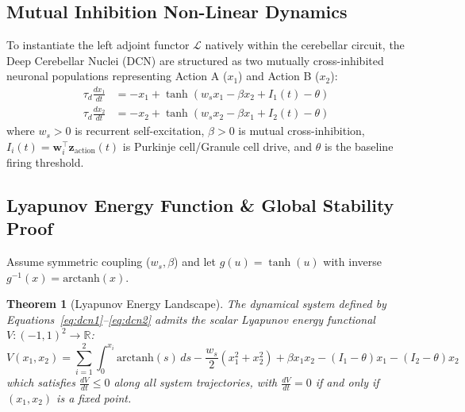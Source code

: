 \documentclass[11pt,a4paper]{article}
\newtheorem{theorem}{Theorem}
\begin{document}
\subsection{Mutual Inhibition Non-Linear Dynamics}
To instantiate the left adjoint functor $\mathcal{L}$ natively within the cerebellar circuit, the Deep Cerebellar Nuclei (DCN) are structured as two mutually cross-inhibited neuronal populations representing Action A ($x_1$) and Action B ($x_2$):
\begin{align}
\tau_d \frac{dx_1}{dt} &= -x_1 + \tanh\left( w_s x_1 - \beta x_2 + I_1(t) - \theta \right) \label{eq:dcn1} \\
\tau_d \frac{dx_2}{dt} &= -x_2 + \tanh\left( w_s x_2 - \beta x_1 + I_2(t) - \theta \right) \label{eq:dcn2}
\end{align}
where $w_s > 0$ is recurrent self-excitation, $\beta > 0$ is mutual cross-inhibition, $I_i(t) = \mathbf{w}_{i}^\top \mathbf{z}_{\text{action}}(t)$ is Purkinje cell/Granule cell drive, and $\theta$ is the baseline firing threshold.

\subsection{Lyapunov Energy Function \& Global Stability Proof}
Assume symmetric coupling ($w_s, \beta$) and let $g(u) = \tanh(u)$ with inverse $g^{-1}(x) = \text{arctanh}(x)$.

\begin{theorem}[Lyapunov Energy Landscape]
The dynamical system defined by Equations~\eqref{eq:dcn1}--\eqref{eq:dcn2} admits the scalar Lyapunov energy functional $V: (-1, 1)^2 \to \mathbb{R}$:
\begin{equation}
V(x_1, x_2) = \sum_{i=1}^2 \int_0^{x_i} \text{arctanh}(s)\, ds - \frac{w_s}{2}(x_1^2 + x_2^2) + \beta x_1 x_2 - (I_1 - \theta)x_1 - (I_2 - \theta)x_2
\end{equation}
which satisfies $\frac{dV}{dt} \le 0$ along all system trajectories, with $\frac{dV}{dt} = 0$ if and only if $(x_1, x_2)$ is a fixed point.
\end{theorem}
\end{document}
